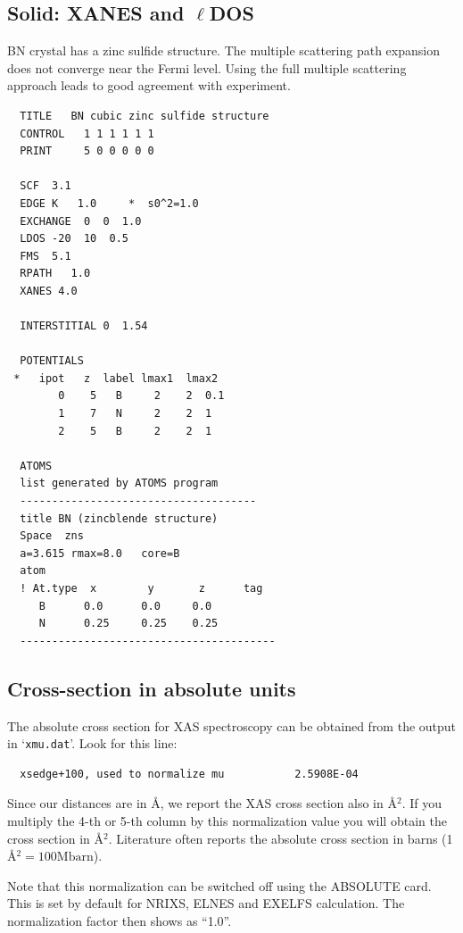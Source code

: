 \documentclass[11pt,oneside]{report} %
\newcommand{\file}[1]{`\texttt{#1}'}
\begin{document}
\subsection{Solid: XANES and $\ell$DOS}
\label{sec:Solid-1}
BN crystal has a zinc sulfide structure.  The
multiple scattering path expansion does not converge near the Fermi level.
Using the full multiple scattering approach leads to good agreement
with experiment.

\begin{verbatim}
  TITLE   BN cubic zinc sulfide structure
  CONTROL   1 1 1 1 1 1
  PRINT     5 0 0 0 0 0 
 
  SCF  3.1
  EDGE K   1.0     *  s0^2=1.0
  EXCHANGE  0  0  1.0
  LDOS -20  10  0.5
  FMS  5.1
  RPATH   1.0
  XANES 4.0
 
  INTERSTITIAL 0  1.54
 
  POTENTIALS
 *   ipot   z  label lmax1  lmax2
        0    5   B     2    2  0.1
        1    7   N     2    2  1
        2    5   B     2    2  1
 
  ATOMS
  list generated by ATOMS program
  -------------------------------------
  title BN (zincblende structure)
  Space  zns
  a=3.615 rmax=8.0   core=B
  atom
  ! At.type  x        y       z      tag
     B      0.0      0.0     0.0
     N      0.25     0.25    0.25
  ----------------------------------------
\end{verbatim}


\subsection{Cross-section in absolute units}
\label{sec:Absol-cross-sect}
The absolute cross section for XAS spectroscopy can be obtained from the output in
\file{xmu.dat}. Look for this line:

\begin{verbatim}
  xsedge+100, used to normalize mu           2.5908E-04
\end{verbatim}

Since our distances are in \AA, we report the XAS cross section also in \AA$^2$.
If you multiply the 4-th or 5-th column by this normalization value
you will obtain the cross section in \AA$^2$. Literature often reports the absolute
cross section in barns (1 \AA$^2 = 100 \mathrm{Mbarn}$).

Note that this normalization can be switched off using the ABSOLUTE card.  This is set
by default for NRIXS, ELNES and EXELFS calculation.  The normalization factor then shows as "`1.0"'. 
\end{document}
